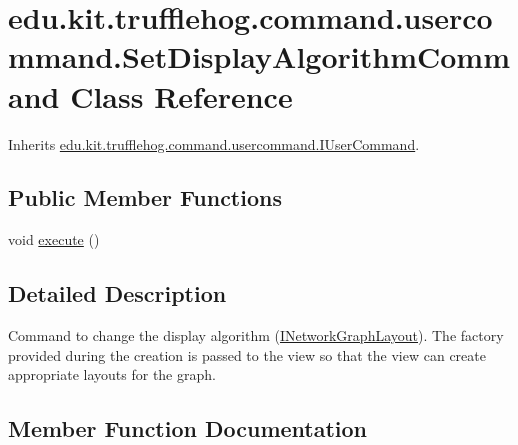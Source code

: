 \hypertarget{classedu_1_1kit_1_1trufflehog_1_1command_1_1usercommand_1_1_set_display_algorithm_command}{}\section{edu.\+kit.\+trufflehog.\+command.\+usercommand.\+Set\+Display\+Algorithm\+Command Class Reference}
\label{classedu_1_1kit_1_1trufflehog_1_1command_1_1usercommand_1_1_set_display_algorithm_command}


Inherits \hyperlink{interfaceedu_1_1kit_1_1trufflehog_1_1command_1_1usercommand_1_1_i_user_command}{edu.\+kit.\+trufflehog.\+command.\+usercommand.\+I\+User\+Command}.

\subsection*{Public Member Functions}
\begin{DoxyCompactItemize}
\item 
void \hyperlink{classedu_1_1kit_1_1trufflehog_1_1command_1_1usercommand_1_1_set_display_algorithm_command_a86a195d5b1ca4683af539fbad74ca62d}{execute} ()
\end{DoxyCompactItemize}


\subsection{Detailed Description}
Command to change the display algorithm (\hyperlink{}{I\+Network\+Graph\+Layout}). The factory provided during the creation is passed to the view so that the view can create appropriate layouts for the graph. 

\subsection{Member Function Documentation}
\hypertarget{classedu_1_1kit_1_1trufflehog_1_1command_1_1usercommand_1_1_set_display_algorithm_command_a86a195d5b1ca4683af539fbad74ca62d}{}
